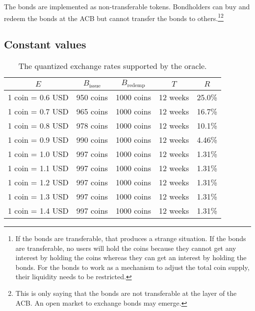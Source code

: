 \documentclass[dvipdfmx,a4paper]{article}
\begin{document}
The bonds are implemented as non-transferable tokens. Bondholders can buy and redeem the bonds at the ACB but cannot transfer the bonds to others.\footnote{ If the bonds are transferable, that produces a strange situation. If the bonds are transferable, no users will hold the coins because they cannot get any interest by holding the coins whereas they can get an interest by holding the bonds. For the bonds to work as a mechanism to adjust the total coin supply, their liquidity needs to be restricted.}\footnote{This is only saying that the bonds are not transferable at the layer of the ACB. An open market to exchange bonds may emerge.}

\subsection{Constant values}

\begin{table}[htb]
\begin{center}
\caption{The quantized exchange rates supported by the oracle.}\vspace{2ex}
\begin{tabular}{rrrrr}\hline
\multicolumn{1}{c}{$E$} & \multicolumn{1}{c}{$B_{\mathrm{issue}}$} & \multicolumn{1}{c}{$B_{\mathrm{redemp}}$} & \multicolumn{1}{c}{$T$} & \multicolumn{1}{c}{$R$}\\\hline
1 coin = 0.6 USD & 950 coins & 1000 coins & 12 weeks & 25.0\%\\
1 coin = 0.7 USD & 965 coins & 1000 coins & 12 weeks & 16.7\%\\
1 coin = 0.8 USD & 978 coins & 1000 coins & 12 weeks & 10.1\%\\
1 coin = 0.9 USD & 990 coins & 1000 coins & 12 weeks & 4.46\%\\
1 coin = 1.0 USD & 997 coins & 1000 coins & 12 weeks & 1.31\%\\
1 coin = 1.1 USD & 997 coins & 1000 coins & 12 weeks & 1.31\%\\
1 coin = 1.2 USD & 997 coins & 1000 coins & 12 weeks & 1.31\%\\
1 coin = 1.3 USD & 997 coins & 1000 coins & 12 weeks & 1.31\%\\
1 coin = 1.4 USD & 997 coins & 1000 coins & 12 weeks & 1.31\%\\\hline
\end{tabular}
\label{table1}
\end{center}
\end{table}
\end{document}
